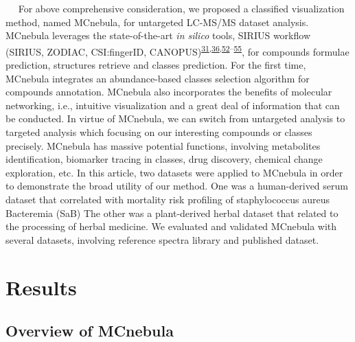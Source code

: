    For above comprehensive consideration, we proposed a classified
visualization method, named MCnebula, for untargeted LC-MS/MS dataset
analysis. MCnebula leverages the state-of-the-art \emph{in silico}
tools, SIRIUS workflow (SIRIUS, ZODIAC, CSI:fingerID,
CANOPUS)\textsuperscript{\protect\hyperlink{ref-2015a}{31},\protect\hyperlink{ref-2019}{36},\protect\hyperlink{ref-2021a}{52}--\protect\hyperlink{ref-2020a}{55}},
for compounds formulae prediction, structures retrieve and classes
prediction. For the first time, MCnebula integrates an abundance-based
classes selection algorithm for compounds annotation. MCnebula also
incorporates the benefits of molecular networking, i.e., intuitive
visualization and a great deal of information that can be conducted. In
virtue of MCnebula, we can switch from untargeted analysis to targeted
analysis which focusing on our interesting compounds or classes
precisely. MCnebula has massive potential functions, involving
metabolites identification, biomarker tracing in classes, drug
discovery, chemical change exploration, etc. In this article, two
datasets were applied to MCnebula in order to demonstrate the broad
utility of our method. One was a human-derived serum dataset that
correlated with mortality risk profiling of staphylococcus aureus
Bacteremia (SaB) The other was a plant-derived herbal dataset that
related to the processing of herbal medicine. We evaluated and validated
MCnebula with several datasets, involving reference spectra library and
published dataset.

\hypertarget{results}{%
\section{\texorpdfstring{\textbf{Results}}{Results}}\label{results}}

\hypertarget{overview-of-mcnebula}{%
\subsection{\texorpdfstring{\textbf{Overview of
MCnebula}}{Overview of MCnebula}}\label{overview-of-mcnebula}}

